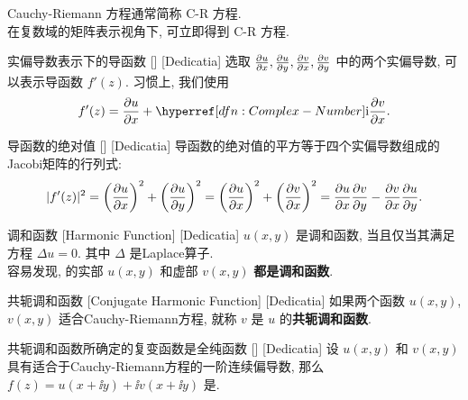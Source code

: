         \begin{rmk}
            [猫猫]
            Cauchy-Riemann 方程通常简称 C-R 方程. \\
            在复数域的矩阵表示视角下, 可立即得到 C-R 方程. \\
            \bysorry
        \end{rmk}

        \begin{crl}
            {实偏导数表示下的导函数}
            []
            [Dedicatia]
            选取 \(\pdv{u}{x}, \pdv{u}{y}, \pdv{v}{x}, \pdv{v}{y}\) 中的两个实偏导数, 可以表示导函数 \(f'(z)\). 习惯上, 我们使用
            \[f'(z)=\pdv{u}{x}+\ii\pdv{v}{x}.\]
        \end{crl}

        \begin{crl}
            {导函数的绝对值}
            []
            [Dedicatia]
            导函数的绝对值的平方等于四个实偏导数组成的Jacobi矩阵的行列式: 
            \[|f'(z)|^2=\qty(\pdv{u}{x})^2+\qty(\pdv{u}{y})^2=\qty(\pdv{u}{x})^2+\qty(\pdv{v}{x})^2=\pdv{u}{x}\pdv{v}{y}-\pdv{v}{x}\pdv{u}{y}.\]
        \end{crl}

        \begin{dfn}
            {调和函数}
            [Harmonic Function]
            [Dedicatia]
            \(u(x,y)\) 是调和函数, 当且仅当其满足方程 \(\Delta u=0\). 其中 \(\Delta\) 是Laplace算子. \\
            容易发现, \Holomorphic{} 的实部 \(u(x,y)\) 和虚部 \(v(x,y)\) \textbf{都是调和函数}. 
        \end{dfn}

        \begin{dfn}
            {共轭调和函数}
            [Conjugate Harmonic Function]
            [Dedicatia]
            如果两个函数 \(u(x,y)\),  \(v(x,y)\) 适合Cauchy-Riemann方程, 就称 \(v\) 是 \(u\) 的\textbf{共轭调和函数}. 
        \end{dfn}

        \begin{thm}
            {共轭调和函数所确定的复变函数是全纯函数}
            []
            [Dedicatia]
            设 \(u(x,y)\) 和 \(v(x,y)\) 具有适合于Cauchy-Riemann方程的一阶连续偏导数, 那么 \(f(z)=u(x+\ii y)+\ii v(x+\ii y)\) 是\Holomorphic{}. 
        \end{thm}

